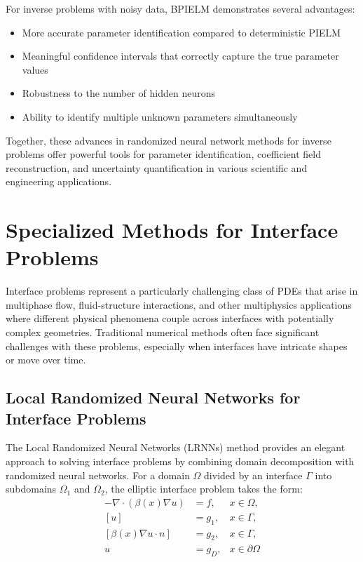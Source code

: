 \documentclass[11pt]{article}
\begin{document}
For inverse problems with noisy data, BPIELM demonstrates several advantages:
\begin{itemize}
    \item More accurate parameter identification compared to deterministic PIELM
    \item Meaningful confidence intervals that correctly capture the true parameter values
    \item Robustness to the number of hidden neurons
    \item Ability to identify multiple unknown parameters simultaneously
\end{itemize}

Together, these advances in randomized neural network methods for inverse problems offer powerful tools for parameter identification, coefficient field reconstruction, and uncertainty quantification in various scientific and engineering applications.

\section{Specialized Methods for Interface Problems}

Interface problems represent a particularly challenging class of PDEs that arise in multiphase flow, fluid-structure interactions, and other multiphysics applications where different physical phenomena couple across interfaces with potentially complex geometries. Traditional numerical methods often face significant challenges with these problems, especially when interfaces have intricate shapes or move over time.

\subsection{Local Randomized Neural Networks for Interface Problems}

The Local Randomized Neural Networks (LRNNs) method \citep{Li2022a} provides an elegant approach to solving interface problems by combining domain decomposition with randomized neural networks. For a domain $\Omega$ divided by an interface $\Gamma$ into subdomains $\Omega_1$ and $\Omega_2$, the elliptic interface problem takes the form:
\begin{align}
-\nabla \cdot (\beta(x)\nabla u) &= f, &x \in \Omega, \\
[u] &= g_1, &x \in \Gamma, \\
[\beta(x)\nabla u \cdot n] &= g_2, &x \in \Gamma, \\
u &= g_D, &x \in \partial\Omega
\end{align}
\end{document}
